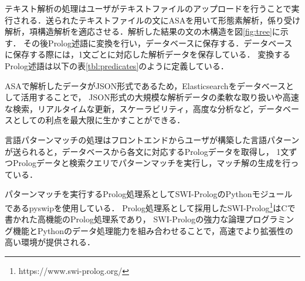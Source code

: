 \documentclass{FITpaper}
\begin{document}
テキスト解析の処理はユーザがテキストファイルのアップロードを行うことで実行される．送られたテキストファイルの文にASA{}を用いて形態素解析，係り受け解析，項構造解析を適応させる．解析した結果の文の木構造を図\ref{fig:tree}に示す．
その後Prolog述語に変換を行い，データベースに保存する．データベースに保存する際には，1文ごとに対応した解析データを保存している．
変換するProlog述語は以下の表\ref{tbl:predicates}のように定義している．%

ASAで解析したデータがJSON形式であるため，Elasticsearchをデータベースとして活用することで，
JSON形式の大規模な解析データの柔軟な取り扱いや高速な検索，リアルタイムな更新，スケーラビリティ，高度な分析など，データベースとしての利点を最大限に生かすことができる．



言語パターンマッチの処理はフロントエンドからユーザが構築した言語パターンが送られると，データベースから各文に対応するPrologデータを取得し，
1文ずつPrologデータと検索クエリでパターンマッチを実行し，マッチ解の生成を行っている．

パターンマッチを実行するProlog処理系としてSWI-PrologのPythonモジュールであるpyswipを使用している．
Prolog処理系として採用したSWI-Prolog\footnote{https://www.swi-prolog.org/}はCで書かれた高機能のProlog処理系であり，
SWI-Prologの強力な論理プログラミング機能とPythonのデータ処理能力を組み合わせることで，高速でより拡張性の高い環境が提供される．







\end{document}

